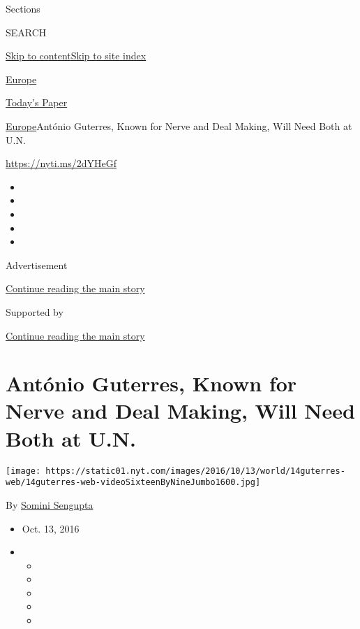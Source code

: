 Sections

SEARCH

\protect\hyperlink{site-content}{Skip to
content}\protect\hyperlink{site-index}{Skip to site index}

\href{https://www.nytimes.com/section/world/europe}{Europe}

\href{https://myaccount.nytimes.com/auth/login?response_type=cookie\&client_id=vi}{}

\href{https://www.nytimes.com/section/todayspaper}{Today's Paper}

\href{/section/world/europe}{Europe}\textbar{}António Guterres, Known
for Nerve and Deal Making, Will Need Both at U.N.

\url{https://nyti.ms/2dYHeGf}

\begin{itemize}
\item
\item
\item
\item
\item
\end{itemize}

Advertisement

\protect\hyperlink{after-top}{Continue reading the main story}

Supported by

\protect\hyperlink{after-sponsor}{Continue reading the main story}

\hypertarget{antuxf3nio-guterres-known-for-nerve-and-deal-making-will-need-both-at-un}{%
\section{António Guterres, Known for Nerve and Deal Making, Will Need
Both at
U.N.}\label{antuxf3nio-guterres-known-for-nerve-and-deal-making-will-need-both-at-un}}

\texttt{[image: https://static01.nyt.com/images/2016/10/13/world/14guterres-web/14guterres-web-videoSixteenByNineJumbo1600.jpg]}

By \href{http://www.nytimes.com/by/somini-sengupta}{Somini Sengupta}

\begin{itemize}
\item
  Oct. 13, 2016
\item
  \begin{itemize}
  \item
  \item
  \item
  \item
  \item
  \end{itemize}
\end{itemize}

